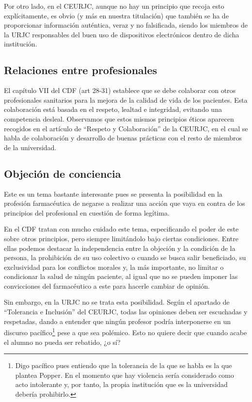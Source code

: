 \documentclass[11pt,a4paper]{article}
\begin{document}
Por otro lado, en el CEURJC, aunque no hay un principio que recoja esto explícitamente, es obvio (y más en nuestra titulación) que también se ha de proporcionar información auténtica, veraz y no falsificada, siendo los miembros de la URJC responsables del buen uso de dispositivos electrónicos dentro de dicha institución.

\subsection{Relaciones entre profesionales}
El capítulo VII del CDF (art 28-31) establece que se debe colaborar con otros profesionales sanitarios para la mejora de la calidad de vida de los pacientes. Esta colaboración está basada en el respeto, lealtad e integridad, evitando una competencia desleal. Observamos que estos mismos principios éticos aparecen recogidos en el artículo de “Respeto y Colaboración” de la CEURJC, en el cual se habla de colaboración y desarrollo de buenas prácticas con el resto de miembros de la universidad.


\subsection{Objeción de conciencia}
Este es un tema bastante interesante pues se presenta la posibilidad en la profesión farmacéutica de negarse a realizar una acción que vaya en contra de los principios del profesional en cuestión de forma legítima.

En el CDF tratan con mucho cuidado este tema, especificando el poder de este sobre otros principios, pero siempre limitándolo bajo ciertas condiciones. Entre ellas podemos destacar la independencia entre la objeción y la condición de la persona, la prohibición de su uso colectivo o cuando se busca salir beneficiado, su exclusividad para los conflictos morales y, la más importante, no limitar o condicionar la salud de ningún paciente, al igual que no se pueden imponer las convicciones del farmacéutico a este para hacerle cambiar de opinión.

Sin embargo, en la URJC no se trata esta posibilidad. Según el apartado de “Tolerancia e Inclusión” del CEURJC, todas las opiniones deben ser escuchadas y respetadas, dando a entender que ningún profesor podría interponerse en un discurso pacífico\footnote{Digo pacífico pues entiendo que la tolerancia de la que se habla es la que plantea Popper. En el momento que hay violencia sería considerado como acto intolerante y, por tanto, la propia institución que es la universidad debería prohibirlo.} pese a que sea polémico. Esto no quiere decir que cuando acabe el alumno no pueda ser rebatido, ¿o sí?
\end{document}
